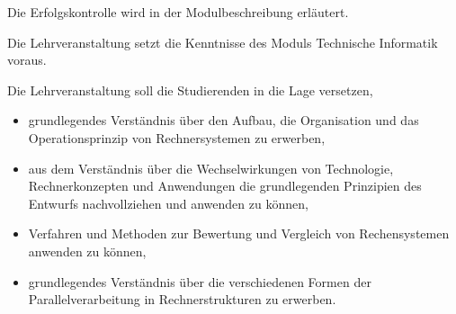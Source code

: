 \begin{course}

\setdoclanguagegerman
{}



\coursehead


\label{cour_7099.dp_997}


\begin{styleenv}
\begin{assessment}
Die Erfolgskontrolle wird in der Modulbeschreibung erläutert.


\end{assessment}

\begin{conditions}Die Lehrveranstaltung setzt die Kenntnisse des Moduls Technische Informatik voraus.

\end{conditions}


\end{styleenv}

\begin{learningoutcomes}
Die Lehrveranstaltung soll die Studierenden in die Lage versetzen,

 \begin{itemize}\item grundlegendes Verständnis über den Aufbau, die Organisation und das Operationsprinzip von Rechnersystemen zu erwerben,  \item aus dem Verständnis über die Wechselwirkungen von Technologie, Rechnerkonzepten und Anwendungen die grundlegenden Prinzipien des Entwurfs nachvollziehen und anwenden zu können,  \item Verfahren und Methoden zur Bewertung und Vergleich von Rechensystemen anwenden zu können,  \item grundlegendes Verständnis über die verschiedenen Formen der Parallelverarbeitung in Rechnerstrukturen zu erwerben.  \end{itemize}


\end{learningoutcomes}
\end{course}
